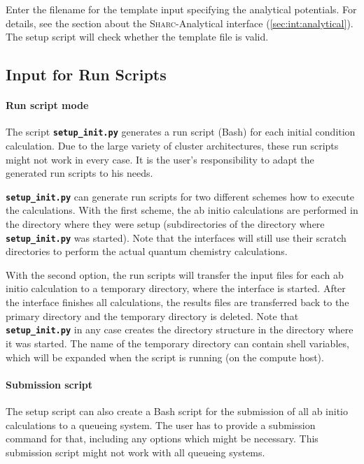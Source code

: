 \documentclass[a4paper,11pt,DIV=15,openany,twoside=false]{scrbook}
\newcommand{\sharc}{\textsc{Sharc}}
\newcommand{\ttt}[1]{\textbf{\texttt{#1}}}
\begin{document}
Enter the filename for the template input specifying the analytical potentials. For details, see the section about the \sharc-Analytical interface (\ref{sec:int:analytical}). The setup script will check whether the template file is valid. 



\subsection{Input for Run Scripts}\label{sec:setup_init.py:run}

\paragraph{Run script mode}

The script \ttt{setup\_init.py} generates a run script (Bash) for each initial condition calculation. Due to the large variety of cluster architectures, these run scripts might not work in every case. It is the user's responsibility to adapt the generated run scripts to his needs.

\ttt{setup\_init.py} can generate run scripts for two different schemes how to execute the calculations. With the first scheme, the ab initio calculations are performed in the directory where they were setup (subdirectories of the directory where \ttt{setup\_init.py} was started). Note that the interfaces will still use their scratch directories to perform the actual quantum chemistry calculations.

With the second option, the run scripts will transfer the input files for each ab initio calculation to a temporary directory, where the interface is started. After the interface finishes all calculations, the results files are transferred back to the primary directory and the temporary directory is deleted. Note that \ttt{setup\_init.py} in any case creates the directory structure in the directory where it was started. The name of the temporary directory can contain shell variables, which will be expanded when the script is running (on the compute host).

\paragraph{Submission script}

The setup script can also create a Bash script for the submission of all ab initio calculations to a queueing system. The user has to provide a submission command for that, including any options which might be necessary. This submission script might not work with all queueing systems.
\end{document}
